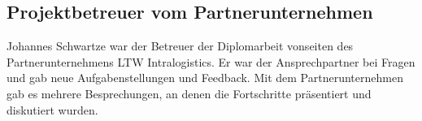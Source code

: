 \subsection{Projektbetreuer vom Partnerunternehmen}
Johannes Schwartze war der Betreuer der Diplomarbeit vonseiten des Partnerunternehmens LTW Intralogistics. Er war der Ansprechpartner bei Fragen und gab neue Aufgabenstellungen und Feedback. Mit dem Partnerunternehmen gab es mehrere Besprechungen, an denen die Fortschritte präsentiert und diskutiert wurden.